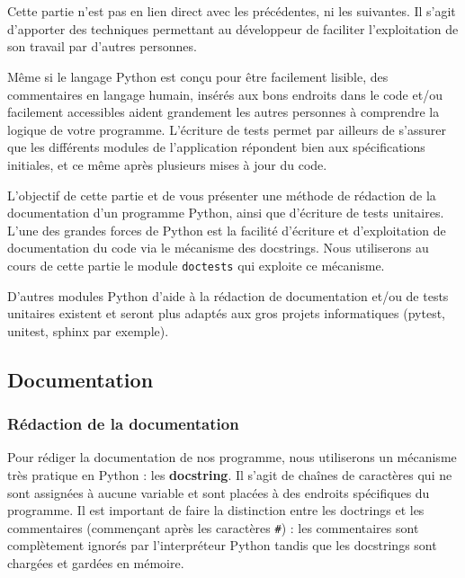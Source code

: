 \documentclass[12pt, a4paper]{article}
\begin{document}
\chapter{}

Cette partie n'est pas en lien direct avec les précédentes, ni les suivantes. Il s'agit d'apporter des techniques permettant au développeur de faciliter l'exploitation de son travail par d'autres personnes.

Même si le langage Python est conçu pour être facilement lisible, des commentaires en langage humain, insérés aux bons endroits dans le code et/ou facilement accessibles aident grandement les autres personnes à comprendre la logique de votre programme. L'écriture de tests permet par ailleurs de s'assurer que les différents modules de l'application répondent bien aux spécifications initiales, et ce même après plusieurs mises à jour du code. 

L'objectif de cette partie et de vous présenter une méthode de rédaction de la documentation d'un programme Python, ainsi que d'écriture de tests unitaires. L'une des grandes forces de Python est la facilité d'écriture et d'exploitation de documentation du code via le mécanisme des docstrings. Nous utiliserons au cours de cette partie le module \lstinline{doctests} qui exploite ce mécanisme.

D'autres modules Python d'aide à la rédaction de documentation et/ou de tests unitaires existent et seront plus adaptés aux gros projets informatiques (pytest, unitest, sphinx par exemple).


\section{Documentation}

\subsection{Rédaction de la documentation}
Pour rédiger la documentation de nos programme, nous utiliserons un mécanisme très pratique en Python : les \textbf{docstring}. Il s'agit de chaînes de caractères qui ne sont assignées à aucune variable et sont placées à des endroits spécifiques du programme. Il est important de faire la distinction entre les doctrings et les commentaires (commençant après les caractères \lstinline{#}) : les commentaires sont complètement ignorés par l'interpréteur Python tandis que les docstrings sont chargées et gardées en mémoire.
\end{document}
